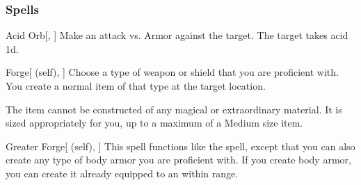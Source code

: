 \subsubsection{Spells}


\lowercase{\hypertarget{spell:Acid Orb}{}}\label{spell:Acid Orb}
\begin{freeability}[Rank 1]{\hypertarget{spell:Acid Orb}{Acid Orb}}[, ]
Make an attack vs. Armor against the target.
\hit The target takes acid  \plus1d.
\end{freeability}
\vspace{0.25em}



\lowercase{\hypertarget{spell:Forge}{}}\label{spell:Forge}
\begin{attuneability}[Rank 1]{\hypertarget{spell:Forge}{Forge}}[ (self), ]
Choose a type of weapon or shield that you are proficient with.
You create a normal item of that type at the target location.

The item cannot be constructed of any magical or extraordinary material.
It is sized appropriately for you, up to a maximum of a Medium size item.
\end{attuneability}
\vspace{0.25em}



\lowercase{\hypertarget{spell:Greater Forge}{}}\label{spell:Greater Forge}
\begin{attuneability}[Rank 3]{\hypertarget{spell:Greater Forge}{Greater Forge}}[ (self), ]
This spell functions like the  spell, except that you can also create any type of body armor you are proficient with.
If you create body armor, you can create it already equipped to an  within range.
\end{attuneability}
\vspace{0.25em}



